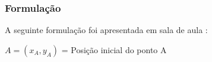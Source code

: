 \documentclass[10pt, a4paper]{article}
\begin{document}




\subsubsection{Formulação}
A seguinte formulação foi apresentada em sala de aula :
\vspace{3mm}

$A = (x_A, y_A)$ = Posição inicial do ponto A
\end{document}
